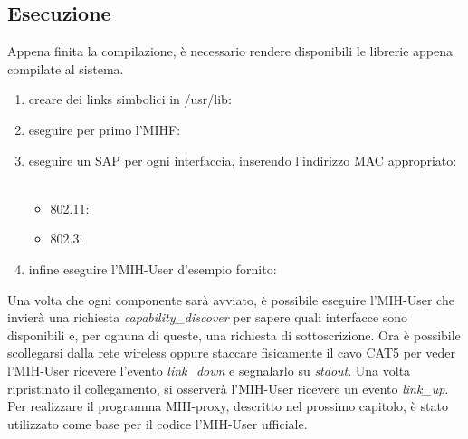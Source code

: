 \subsection{Esecuzione}

Appena finita la compilazione, è necessario rendere disponibili le librerie appena compilate al sistema.

\begin{enumerate}

\item creare dei links simbolici in /usr/lib:\\

\item eseguire per primo l'MIHF:\\

\item eseguire un SAP per ogni interfaccia, inserendo l'indirizzo MAC appropriato:
\\\\\begin{itemize}

\item 802.11:\\

\item 802.3:\\
\end{itemize}
\item infine eseguire l'MIH-User d'esempio fornito:\\

\end{enumerate}

Una volta che ogni componente sarà avviato, è possibile eseguire l'MIH-User che invierà una richiesta {\em capability\_discover} per sapere quali interfacce sono disponibili e, per ognuna di queste, una richiesta di sottoscrizione. Ora è possibile scollegarsi dalla rete wireless oppure staccare fisicamente il cavo CAT5 per veder l'MIH-User ricevere l'evento {\em link\_down} e segnalarlo su {\em stdout}. Una volta ripristinato il collegamento, si osserverà l'MIH-User ricevere un evento {\em link\_up}. Per realizzare il programma MIH-proxy, descritto nel prossimo capitolo, è stato utilizzato come base per il codice l'MIH-User ufficiale.

